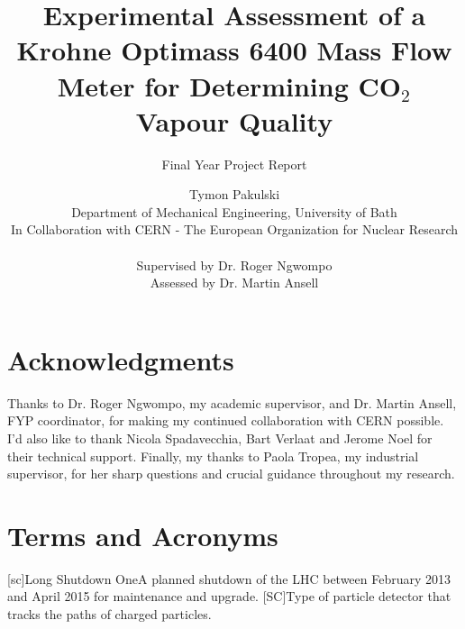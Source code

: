 \documentclass{report}
\author{Tymon Pakulski\\Department of Mechanical Engineering, University of Bath\\In Collaboration with CERN - The European Organization for Nuclear Research \\\\ Supervised by Dr. Roger Ngwompo\\Assessed by Dr. Martin Ansell}
\title{Experimental Assessment of a Krohne Optimass 6400 Mass Flow Meter for Determining CO$_2$ Vapour Quality}
\subtitle{Final Year Project Report}
\begin{document}
\graphicspath{{figures/}}

\maketitle
\begin{abstract}
\end{abstract}
\section*{Acknowledgments}
Thanks to Dr. Roger Ngwompo, my academic supervisor, and Dr. Martin Ansell, FYP coordinator, for making my continued collaboration with CERN possible. I'd also like to thank Nicola Spadavecchia, Bart Verlaat and Jerome Noel for their technical support. Finally, my thanks to Paola Tropea, my industrial supervisor, for her sharp questions and crucial guidance throughout my research. 
\newpage
\section*{Terms and Acronyms}
\begin{acronym}
[sc]{Long Shutdown One}{A planned shutdown of the LHC between February 2013 and April 2015 for maintenance and upgrade.}
[SC]{Type of particle detector that tracks the paths of charged particles.} 
\end{acronym}
\end{document}
